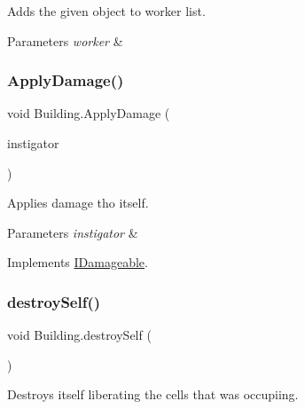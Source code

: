 Adds the given object to worker list. 


\begin{DoxyParams}{Parameters}
{\em worker} & \\
\hline
\end{DoxyParams}
\mbox{\label{class_building_a1486c409143123873c387c5bd7918b76}} 
\subsubsection{\texorpdfstring{Apply\+Damage()}{ApplyDamage()}}
{\footnotesize\ttfamily void Building.\+Apply\+Damage (\begin{DoxyParamCaption}\item[{\mbox{\hyperlink{interface_i_shooter}{I\+Shooter}}}]{instigator }\end{DoxyParamCaption})}



Applies damage tho itself. 


\begin{DoxyParams}{Parameters}
{\em instigator} & \\
\hline
\end{DoxyParams}


Implements \mbox{\hyperlink{interface_i_damageable}{I\+Damageable}}.

\mbox{\label{class_building_abb43fc4e8f9666d50c67208886785ff3}} 
\subsubsection{\texorpdfstring{destroy\+Self()}{destroySelf()}}
{\footnotesize\ttfamily void Building.\+destroy\+Self (\begin{DoxyParamCaption}{ }\end{DoxyParamCaption})}



Destroys itself liberating the cells that was occupiing. 

\mbox{\label{class_building_ac9c5243414b3e56c11b3af749c5dd61d}} 
